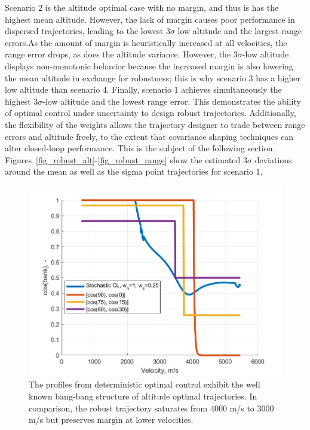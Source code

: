 \documentclass[journal ]{new-aiaa}
\begin{document}
Scenario 2 is the altitude optimal case with no margin, and thus is has the highest mean altitude. However, the lack of margin causes poor performance in dispersed trajectories, leading to the lowest $ 3\sigma $ low altitude and the largest range errors.As the amount of margin is heuristically increased at all velocities, the range error drops, as does the altitude variance. However, the $ 3\sigma $-low altitude displays non-monotonic behavior because the increased margin is also lowering the mean altitude in exchange for robustness; this is why scenario 3 has a higher low altitude than scenario 4. Finally, scenario 1 achieves simultaneously the highest $ 3\sigma$-low altitude and the lowest range error. This demonstrates the ability of optimal control under uncertainty to design robust trajectories. Additionally, the flexibility of the weights allows the trajectory designer to trade between range errors and altitude freely, to the extent that covariance shaping techniques can alter closed-loop performance. This is the subject of the following section. Figures~\ref{fig_robust_alt}-\ref{fig_robust_range} show the estimated $3\sigma$ deviations around the mean as well as the sigma point trajectories for scenario 1.
\begin{figure}[h!]
	\centering
	\includegraphics[width=1\textwidth]{ddp/matlab/ComparisonControl}
	\caption{The profiles from deterministic optimal control exhibit the well known bang-bang structure of altitude optimal trajectories. In comparison, the robust trajectory saturates from 4000 m/s to 3000 m/s but preserves margin at lower velocities.}
	\label{fig_control_comparison}
\end{figure}
\end{document}
